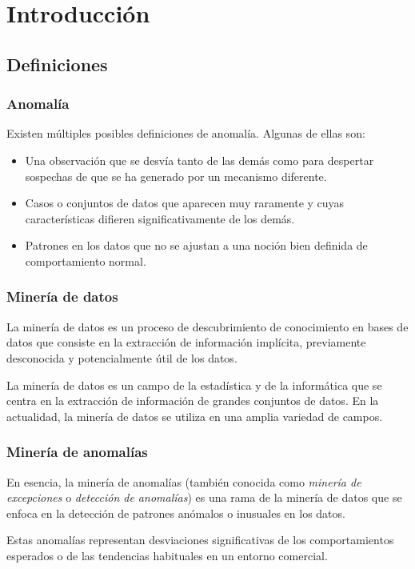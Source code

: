 \chapter{Introducción}
\section{Definiciones}
\subsection{Anomalía}
Existen múltiples posibles definiciones de anomalía. Algunas de ellas son:
\begin{itemize}[topsep=0pt]
	\item Una observación que se desvía tanto de las demás como para despertar sospechas de
		que se ha generado por un mecanismo diferente.
	\item Casos o conjuntos de datos que aparecen muy raramente y cuyas características
		difieren significativamente de los demás.
	\item Patrones en los datos que no se ajustan a una noción bien definida de comportamiento
		normal.
\end{itemize}

\subsection{Minería de datos}
La minería de datos es un proceso de descubrimiento de conocimiento en bases de datos que
consiste en la extracción de información implícita, previamente desconocida y potencialmente
útil de los datos.

La minería de datos es un campo de la estadística y de la informática que se centra en la
extracción de información de grandes conjuntos de datos. En la actualidad, la minería de datos
se utiliza en una amplia variedad de campos.

\subsection{Minería de anomalías}
En esencia, la minería de anomalías (también conocida como \textit{minería de excepciones} o
\textit{detección de anomalías}) es una rama de la minería de datos que se enfoca en
la detección de patrones anómalos o inusuales en los datos.

Estas anomalías representan desviaciones significativas de los comportamientos esperados
o de las tendencias habituales en un entorno comercial.

